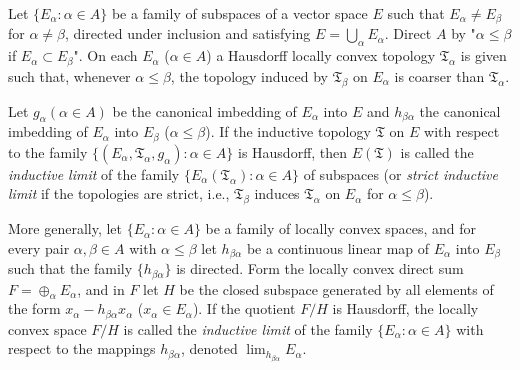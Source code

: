 Let $\{E_\alpha: \alpha \in A\}$ be a family of subspaces of a vector space $E$ such that $E_\alpha \neq E_\beta$ for $\alpha \neq \beta$, directed under inclusion and satisfying $E = \bigcup_\alpha E_\alpha$. Direct $A$ by "$\alpha \leq \beta$ if $E_\alpha \subset E_\beta$". On each $E_\alpha$ ($\alpha \in A$) a Hausdorff locally convex topology $\mathfrak{T}_\alpha$ is given such that, whenever $\alpha \leq \beta$, the topology induced by $\mathfrak{T}_\beta$ on $E_\alpha$ is coarser than $\mathfrak{T}_\alpha$.

Let $g_\alpha (\alpha \in A)$ be the canonical imbedding of $E_\alpha$ into $E$ and $h_{\beta\alpha}$ the canonical imbedding of $E_\alpha$ into $E_\beta$ ($\alpha \leq \beta$). If the inductive topology $\mathfrak{T}$ on $E$ with respect to the family $\{(E_\alpha, \mathfrak{T}_\alpha, g_\alpha): \alpha \in A\}$ is Hausdorff, then $E(\mathfrak{T})$ is called the \textit{inductive limit} of the family $\{E_\alpha(\mathfrak{T}_\alpha): \alpha \in A\}$ of subspaces (or \textit{strict inductive limit} if the topologies are strict, i.e., $\mathfrak{T}_\beta$ induces $\mathfrak{T}_\alpha$ on $E_\alpha$ for $\alpha \leq \beta$).

More generally, let $\{E_\alpha: \alpha \in A\}$ be a family of locally convex spaces, and for every pair $\alpha, \beta \in A$ with $\alpha \leq \beta$ let $h_{\beta\alpha}$ be a continuous linear map of $E_\alpha$ into $E_\beta$ such that the family $\{h_{\beta\alpha}\}$ is directed. Form the locally convex direct sum $F = \oplus_\alpha E_\alpha$, and in $F$ let $H$ be the closed subspace generated by all elements of the form $x_\alpha - h_{\beta\alpha} x_\alpha$ ($x_\alpha \in E_\alpha$). If the quotient $F/H$ is Hausdorff, the locally convex space $F/H$ is called the \textit{inductive limit} of the family $\{E_\alpha: \alpha \in A\}$ with respect to the mappings $h_{\beta\alpha}$, denoted $\lim_{h_{\beta\alpha}} E_\alpha$.
